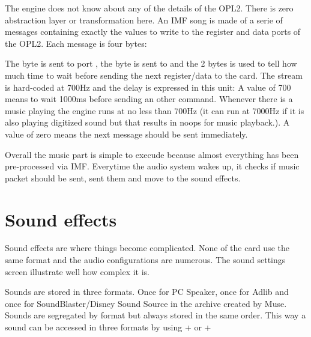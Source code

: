 \par
The engine does not know about any of the details of the OPL2. There is zero abstraction layer or transformation here. An IMF song is made of a serie of messages containing exactly the values to write to the register and data ports of the OPL2. Each message is four bytes:\\
\par
\begin{minipage}{\textwidth}

\end{minipage}
\par
The  byte is sent to port , the  byte is sent to  and the  2 bytes is used to tell how much time to wait before sending the next register/data to the card. The stream is hard-coded at 700Hz and the delay is expressed in this unit: A value of 700 means to wait 1000ms before sending an other command. Whenever there is a music playing the engine runs at no less than 700Hz (it can run at 7000Hz if it is also playing digitized sound but that results in noops for music playback.). A value of zero means the next message should be sent immediately.\\
\par
Overall the music part is simple to execude because almost everything has been pre-processed via IMF. Everytime the audio system wakes up, it checks if music packet should be sent, sent them and move to the sound effects.










\section{Sound effects}
Sound effects are where things become complicated. None of the card use the same format and
the audio configurations are numerous. The sound settings screen illustrate well how complex it is.
\par
\begin{figure}[H]
\centering
 \end{figure}
\par
Sounds are stored in three formats. Once for PC Speaker, once for Adlib and once for SoundBlaster/Disney Sound Source in the  archive created by Muse. Sounds are segregated by format but always stored in the same order. This way a sound can be accessed in three formats by using  +  or  + \\

